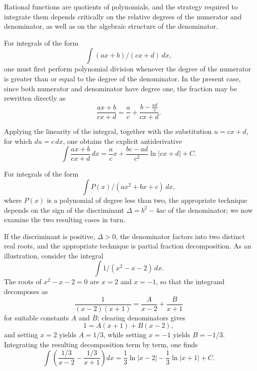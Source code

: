 Rational functions are quotients of polynomials, and the strategy required to integrate them depends critically on the relative degrees of the numerator and denominator, as well as on the algebraic structure of the denominator.


For integrals of the form
\[
\int (ax+b)/(cx+d) \, dx,
\]
one must first perform polynomial division whenever the degree of the numerator is greater than or equal to the degree of the denominator. In the present case, since both numerator and denominator have degree one, the fraction may be rewritten directly as
\[
\frac{ax+b}{cx+d} = \frac{a}{c} + \frac{b - \tfrac{ad}{c}}{cx+d}.
\]

Applying the linearity of the integral, together with the substitution $u = cx+d$, for which $du = c \, dx$, one obtains the explicit antiderivative
\[
\int \frac{ax+b}{cx+d} \, dx = \frac{a}{c} x + \frac{bc-ad}{c^2} \ln|cx+d| + C.
\]

For integrals of the form \[
\int P(x)/(ax^2+bx+c) \, dx,
\] where $P(x)$ is a polynomial of degree less than two, the appropriate technique depends on the sign of the discriminant $\Delta = b^2 - 4ac$ of the denominator; we now examine the two resulting cases in turn.

If the discriminant is positive, $\Delta > 0$, the denominator factors into two distinct real roots, and the appropriate technique is partial fraction decomposition. As an illustration, consider the integral
\[
\int 1/(x^2-x-2) \, dx.
\]
The roots of $x^2-x-2=0$ are $x=2$ and $x=-1$, so that the integrand decomposes as
\[
\frac{1}{(x-2)(x+1)} = \frac{A}{x-2} + \frac{B}{x+1}
\]
 for suitable constants $A$ and $B$; clearing denominators gives
\[
1 = A(x+1) + B(x-2),
\] and setting $x=2$ yields $A = 1/3$, while setting $x=-1$ yields $B = -1/3$. Integrating the resulting decomposition term by term, one finds
\[
\int \left( \frac{1/3}{x-2} - \frac{1/3}{x+1} \right) dx = \frac{1}{3} \ln|x-2| - \frac{1}{3} \ln|x+1| + C.
\]

